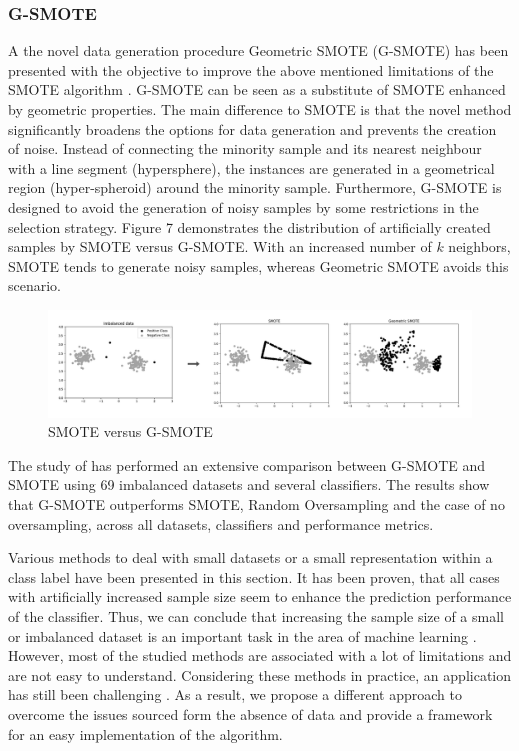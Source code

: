 \documentclass[parskip=full]{scrartcl}
\begin{document}
\subsubsection{G-SMOTE}

A the novel data generation procedure Geometric SMOTE (G-SMOTE) has been 
presented with the objective to improve the above mentioned limitations of the 
SMOTE algorithm \cite{Douzas.2019b}. G-SMOTE can be seen as a substitute of 
SMOTE enhanced by geometric properties. The main difference to SMOTE is that 
the novel method significantly broadens the options for data generation and 
prevents the creation of noise. Instead of connecting the minority sample and 
its nearest neighbour with a line segment (hypersphere), the instances are 
generated in a geometrical region (hyper-spheroid) around the minority sample. 
Furthermore, G-SMOTE is designed to avoid the generation of noisy samples by 
some restrictions in the selection strategy. Figure 7 demonstrates the 
distribution of artificially created samples by SMOTE versus G-SMOTE. With an 
increased number of $\mathit{k}$ neighbors, SMOTE tends to generate noisy 
samples, whereas Geometric SMOTE avoids this scenario.

\begin{figure}[H]
	\centering
	\includegraphics[width=1\linewidth]{./resources/smote_vs_gsmote}
	\caption{SMOTE versus G-SMOTE \cite{Douzas.2019}}
	\label{fig:smotevsgsmote}
\end{figure}

The study of \cite{Douzas.2019b} has performed an extensive comparison between 
G-SMOTE and SMOTE using 69 imbalanced datasets and several classifiers. The 
results show that G-SMOTE outperforms SMOTE, Random Oversampling and the case 
of no oversampling, across all datasets, classifiers and performance 
metrics.    

Various methods to deal with small datasets or a small representation 
within a class label have been presented in this section. It has been proven, 
that all cases with artificially increased sample size seem to enhance the 
prediction performance of the classifier. Thus, we can conclude 
that increasing the sample size of a small or imbalanced dataset is an 
important task in the area of machine learning \cite{Ruparel.2013}. However, 
most of the studied methods are associated with a lot of limitations and are 
not easy to understand. Considering these methods in practice, an application 
has still been challenging \cite{Sezer.2014}. As a result, we propose a 
different approach to overcome the issues sourced form the absence of data and 
provide a framework for an easy implementation of the algorithm.
\end{document}
